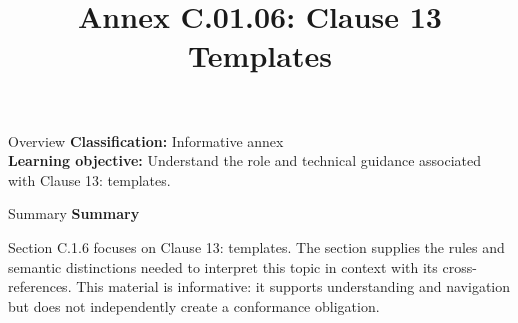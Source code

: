 \documentclass[10pt,letterpaper]{article}
\title{Annex C.01.06: Clause 13 Templates}
\author{}
\date{}
\begin{document}
\maketitle
\begin{CornellOverviewBox}{Overview}
\textbf{Classification:} Informative annex\\[2pt]
\textbf{Learning objective:} Understand the role and technical guidance associated with Clause 13: templates.
\end{CornellOverviewBox}\begin{CornellSummaryBox}{Summary}
{\sffamily\bfseries\color{Accent} Summary}\par\vspace{3pt}Section C.1.6 focuses on Clause 13: templates. The section supplies the rules and semantic distinctions needed to interpret this topic in context with its cross-references. This material is informative: it supports understanding and navigation but does not independently create a conformance obligation.
\end{CornellSummaryBox}
\end{document}

